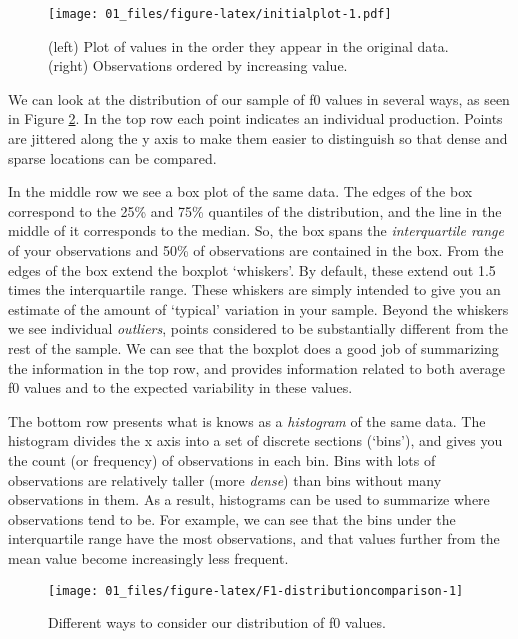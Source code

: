 \documentclass[
]{book}
\begin{document}
\begin{figure}
\centering
\texttt{[image: 01\_files/figure-latex/initialplot-1.pdf]}
\caption{\label{fig:initialplot}(left) Plot of values in the order they appear in the original data. (right) Observations ordered by increasing value.}
\end{figure}

We can look at the distribution of our sample of f0 values in several ways, as seen in Figure \ref{fig:F1-distributioncomparison}. In the top row each point indicates an individual production. Points are jittered along the y axis to make them easier to distinguish so that dense and sparse locations can be compared.

In the middle row we see a box plot of the same data. The edges of the box correspond to the 25\% and 75\% quantiles of the distribution, and the line in the middle of it corresponds to the median. So, the box spans the \emph{interquartile range} of your observations and 50\% of observations are contained in the box. From the edges of the box extend the boxplot `whiskers'. By default, these extend out 1.5 times the interquartile range. These whiskers are simply intended to give you an estimate of the amount of `typical' variation in your sample. Beyond the whiskers we see individual \emph{outliers}, points considered to be substantially different from the rest of the sample. We can see that the boxplot does a good job of summarizing the information in the top row, and provides information related to both average f0 values and to the expected variability in these values.

The bottom row presents what is knows as a \emph{histogram} of the same data. The histogram divides the x axis into a set of discrete sections (`bins'), and gives you the count (or frequency) of observations in each bin. Bins with lots of observations are relatively taller (more \emph{dense}) than bins without many observations in them. As a result, histograms can be used to summarize where observations tend to be. For example, we can see that the bins under the interquartile range have the most observations, and that values further from the mean value become increasingly less frequent.

\begin{figure}

{\centering \texttt{[image: 01\_files/figure-latex/F1-distributioncomparison-1]} 

}

\caption{Different ways to consider our distribution of f0 values.}\label{fig:F1-distributioncomparison}
\end{figure}
\end{document}
